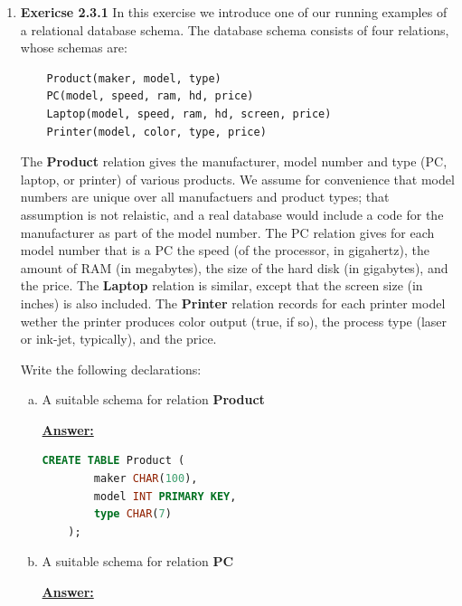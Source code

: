 \documentclass[12pt]{article}
\begin{document}
\begin{enumerate}[1.]
    \item \textbf{Exericse 2.3.1} In this exercise we introduce one of our running
    examples of a relational database schema. The database schema consists of four relations,
    whose schemas are:

    \bigskip

    \begin{lstlisting}
    Product(maker, model, type)
    PC(model, speed, ram, hd, price)
    Laptop(model, speed, ram, hd, screen, price)
    Printer(model, color, type, price)
    \end{lstlisting}

    The \textbf{Product} relation gives the manufacturer, model number and type
    (PC, laptop, or printer) of various products. We assume for convenience that
    model numbers are unique over all manufactuers and product types; that assumption is
    not relaistic, and a real database would include a code for the manufacturer
    as part of the model number. The PC relation gives for each model number that
    is a PC the speed (of the processor, in gigahertz), the amount of RAM (in megabytes),
    the size of the hard disk (in gigabytes), and the price. The \textbf{Laptop}
    relation is similar, except that the screen size (in inches) is also included. The
    \textbf{Printer} relation records for each printer model wether the printer
    produces color output (true, if so), the process type (laser or ink-jet, typically),
    and the price.

    \bigskip

    Write the following declarations:

    \begin{enumerate}[a)]
        \item A suitable schema for relation \textbf{Product}

        \begin{mdframed}
            \underline{\textbf{Answer:}}

            \bigskip

    \begin{lstlisting}[language=SQL]
    CREATE TABLE Product (
        maker CHAR(100),
        model INT PRIMARY KEY,
        type CHAR(7)
    );
    \end{lstlisting}

        \end{mdframed}

        \item A suitable schema for relation \textbf{PC}
        \begin{mdframed}
            \underline{\textbf{Answer:}}


\end{mdframed}
\end{enumerate}
\end{enumerate}
\end{document}
